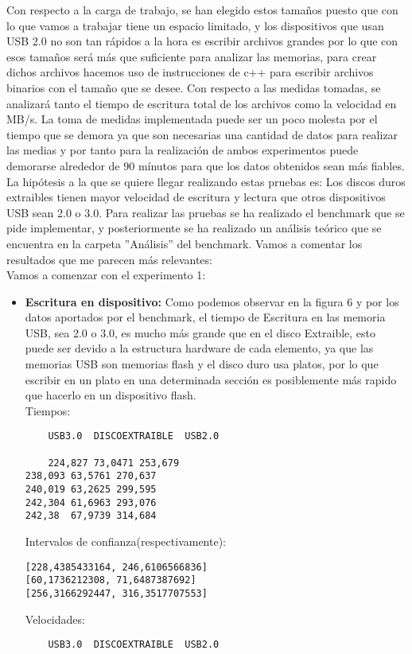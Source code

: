 \documentclass[a4paper, 10pt]{article} %
\begin{document}
\begin{itemize}
\begin{itemize}
Con respecto a la carga de trabajo, se han elegido estos tamaños puesto que con lo que vamos a trabajar tiene un espacio limitado, y los dispositivos que usan USB 2.0 no son tan rápidos a la hora es escribir archivos grandes por lo que con esos tamaños será más que suficiente para analizar las memorias, para crear dichos archivos hacemos uso de instrucciones de c++ para escribir archivos binarios con el tamaño que se desee. 
Con respecto a las medidas tomadas, se analizará tanto el tiempo de escritura total de los archivos como la velocidad en MB/s. La toma de medidas implementada puede ser un poco molesta por el tiempo que se demora ya que son necesarias una cantidad de datos para realizar las medias y por tanto para la realización de ambos experimentos puede demorarse alrededor de 90 mínutos para que los datos obtenidos sean más fiables.
La hipótesis a la que se quiere llegar realizando estas pruebas es: Los discos duros extraibles tienen mayor velocidad de escritura y lectura que otros dispositivos USB sean 2.0 o 3.0. Para realizar las pruebas se ha realizado el benchmark que se pide implementar, y posteriormente se ha realizado un análisis teórico que se encuentra en la carpeta ''Análisis'' del benchmark. Vamos a comentar los resultados que me parecen más relevantes:\\

Vamos a comenzar con el experimento 1:
\begin{itemize}
	\item \textbf{Escritura en dispositivo:}
	Como podemos observar en la figura 6 y por los datos aportados por el benchmark, el tiempo de Escritura en las memoria USB, sea 2.0 o 3.0, es mucho más grande que en el disco Extraible, esto puede ser devido a la estructura hardware de cada elemento, ya que las memorias USB son memorias flash y el disco duro usa platos, por lo que escribir en un plato en una determinada sección es posiblemente más rapido que hacerlo en un dispositivo flash.\\
	Tiempos:
	\begin{verbatim}
	USB3.0	DISCOEXTRAIBLE	USB2.0
	
	224,827	73,0471	253,679
238,093	63,5761	270,637
240,019	63,2625	299,595
242,304	61,6963	293,076
242,38	67,9739	314,684

	\end{verbatim}
	Intervalos de confianza(respectivamente): 
	\begin{verbatim}
[228,4385433164, 246,6106566836]
[60,1736212308, 71,6487387692]
[256,3166292447, 316,3517707553]
	\end{verbatim}
	Velocidades:
	\begin{verbatim}
	USB3.0	DISCOEXTRAIBLE	USB2.0
	

\end{verbatim}
\end{itemize}
\end{itemize}
\end{itemize}
\end{document}
